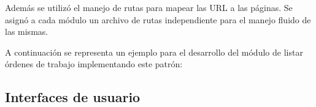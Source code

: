 Además se utilizó el manejo de rutas para mapear las URL a las páginas. Se asignó a cada módulo un archivo de rutas independiente para el manejo fluido de las mismas.

A continuación se representa un ejemplo para el desarrollo del módulo de listar órdenes de trabajo implementando este patrón:



\subsection{Interfaces de usuario}
\label{subsec:frontinterfaces}























	
		

		
		
		
		



